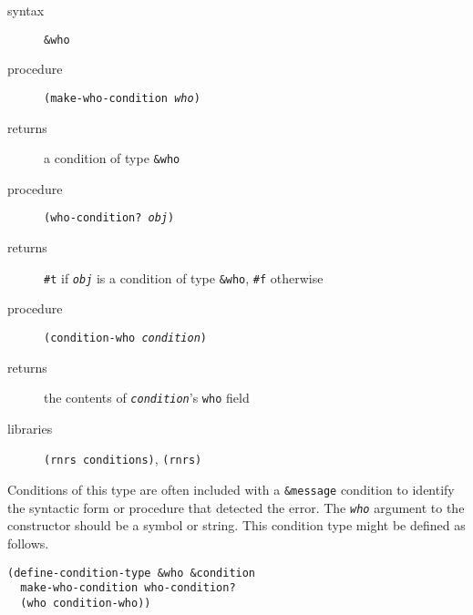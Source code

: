 \begin{description}

\label{exceptions_s26}\item[syntax] \texttt{\&{}who}



\item[procedure] \texttt{(make-who-condition \textit{who})}



\item[returns] a condition of type \texttt{\&{}who}


\item[procedure] \texttt{(who-condition? \textit{obj})}



\item[returns] \texttt{\#{}t} if \texttt{\textit{obj}} is a condition of type \texttt{\&{}who}, \texttt{\#{}f} otherwise


\item[procedure] \texttt{(condition-who \textit{condition})}



\item[returns] the contents of \texttt{\textit{condition}}'s \texttt{who} field


\item[libraries] \texttt{(rnrs conditions)}, \texttt{(rnrs)}
\end{description}



Conditions of this type are often included with a \texttt{\&{}message}
condition to identify the syntactic form or procedure that detected
the error.
The \texttt{\textit{who}} argument to the constructor should
be a symbol or string.
This condition type might be defined as follows.

\begin{alltt}
(define-condition-type \&{}who \&{}condition
  make-who-condition who-condition?
  (who condition-who))
\end{alltt}

